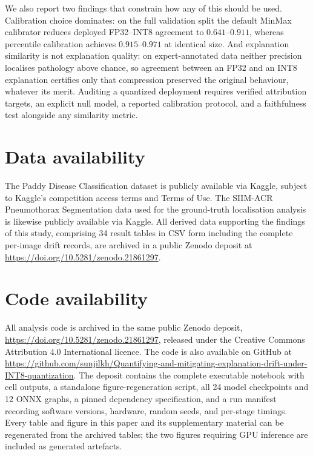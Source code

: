 \documentclass[fleqn,10pt]{wlscirep}
\newcommand{\zenododoi}{10.5281/zenodo.21861297}
\newcommand{\githubrepo}{https://github.com/sunjilkh/Quantifying-and-mitigating-explanation-drift-under-INT8-quantization}
\begin{document}
We also report two findings that constrain how any of this should be used. Calibration choice dominates: on the full validation split the default MinMax calibrator reduces deployed FP32--INT8 agreement to $0.641$--$0.911$, whereas percentile calibration achieves $0.915$--$0.971$ at identical size. And explanation similarity is not explanation quality: on expert-annotated data neither precision localises pathology above chance, so agreement between an FP32 and an INT8 explanation certifies only that compression preserved the original behaviour, whatever its merit. Auditing a quantized deployment requires verified attribution targets, an explicit null model, a reported calibration protocol, and a faithfulness test alongside any similarity metric.

\section*{Data availability}

The Paddy Disease Classification dataset is publicly available via Kaggle, subject to Kaggle's competition access terms and Terms of Use\cite{PaddyDisease2022}. The SIIM-ACR Pneumothorax Segmentation data\cite{SIIMPneumothorax2019} used for the ground-truth localisation analysis is likewise publicly available via Kaggle. All derived data supporting the findings of this study, comprising 34 result tables in CSV form including the complete per-image drift records, are archived in a public Zenodo deposit at \url{https://doi.org/\zenododoi}.

\section*{Code availability}

All analysis code is archived in the same public Zenodo deposit, \url{https://doi.org/\zenododoi}, released under the Creative Commons Attribution 4.0 International licence. The code is also available on GitHub at \url{\githubrepo}. The deposit contains the complete executable notebook with cell outputs, a standalone figure-regeneration script, all 24 model checkpoints and 12 ONNX graphs, a pinned dependency specification, and a run manifest recording software versions, hardware, random seeds, and per-stage timings. Every table and figure in this paper and its supplementary material can be regenerated from the archived tables; the two figures requiring GPU inference are included as generated artefacts.
\end{document}

